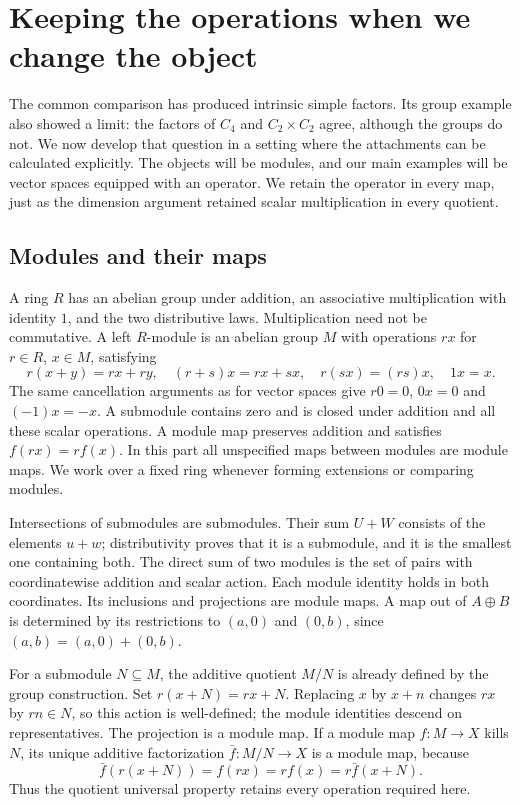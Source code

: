 \section{Keeping the operations when we change the object}
\label{m:section}

The common comparison has produced intrinsic simple factors. Its group example
also showed a limit: the factors of $C_4$ and $C_2\times C_2$ agree, although
the groups do not. We now develop that question in a setting where the
attachments can be calculated explicitly. The objects will be modules,
and our main examples will be vector spaces equipped with an operator.
We retain the operator in every map, just as the dimension argument
retained scalar multiplication in every quotient.

\subsection{Modules and their maps}

A ring $R$ has an abelian group under addition, an associative multiplication
with identity $1$, and the two distributive laws. Multiplication need not be
commutative. A left $R$-module is an abelian group $M$ with operations $rx$
for $r\in R$, $x\in M$, satisfying
\[
 r(x+y)=rx+ry,\quad (r+s)x=rx+sx,\quad
 r(sx)=(rs)x,\quad 1x=x.
\]
The same cancellation arguments as for vector spaces give $r0=0$,
$0x=0$ and $(-1)x=-x$. A submodule contains zero and is closed under
addition and all these scalar operations. A module map preserves addition
and satisfies $f(rx)=rf(x)$. In this part all unspecified maps between
modules are module maps. We work over a fixed ring whenever forming
extensions or comparing modules.

Intersections of submodules are submodules. Their sum $U+W$ consists of
the elements $u+w$; distributivity proves that it is a submodule, and it
is the smallest one containing both. The direct sum of two modules is
the set of pairs with coordinatewise addition and scalar action. Each
module identity holds in both coordinates. Its inclusions and projections
are module maps. A map out of $A\oplus B$ is determined by its restrictions
to $(a,0)$ and $(0,b)$, since $(a,b)=(a,0)+(0,b)$.

For a submodule $N\subseteq M$, the additive quotient $M/N$ is already
defined by the group construction. Set $r(x+N)=rx+N$. Replacing $x$ by
$x+n$ changes $rx$ by $rn\in N$, so this action is well-defined;
the module identities descend on representatives. The projection is a
module map. If a module map $f:M\to X$ kills $N$, its unique additive
factorization $\bar f:M/N\to X$ is a module map, because
\[
 \bar f(r(x+N))=f(rx)=rf(x)=r\bar f(x+N).
\]
Thus the quotient universal property retains every operation required here.

